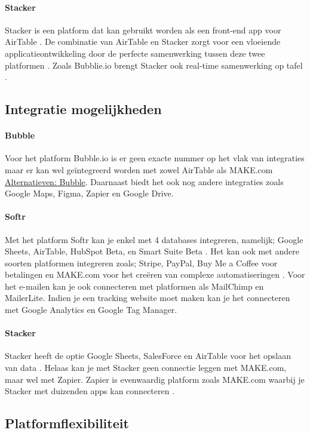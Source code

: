 \paragraph{Stacker}
Stacker is een platform dat kan gebruikt worden als een front-end app voor AirTable \autocite{Advice}. 
De combinatie van AirTable en Stacker zorgt voor een vloeiende applicatieontwikkeling door de perfecte samenwerking tussen deze twee platformen \autocite{Advice}. 
Zoals Bubblie.io brengt Stacker ook real-time samenwerking op tafel \autocite{Allen2020}.
\subsection{Integratie mogelijkheden}%
\label{subsec:integratie-mogelijkheden}
\paragraph{Bubble}
Voor het platform Bubble.io is er geen exacte nummer op het vlak van integraties maar er kan wel geïntegreerd worden met zowel AirTable als MAKE.com \hyperref[subsec:bubble]{Alternatieven: Bubble}. 
Daarnaast biedt het ook nog andere integraties zoals Google Maps, Figma, Zapier en Google Drive.
\paragraph{Softr}
Met het platform Softr kan je enkel met 4 databases integreren, namelijk; Google Sheets, AirTable, HubSpot Beta, en Smart Suite Beta \autocite{Frater2024}. 
Het kan ook met andere soorten platformen integreren zoals; Stripe, PayPal, Buy Me a Coffee voor betalingen en MAKE.com voor het creëren van complexe automatiseringen \autocite{Code2023} \autocite{Youssef2023}. 
Voor het e-mailen kan je ook connecteren met platformen als MailChimp en MailerLite. Indien je een tracking website moet maken kan je het connecteren met Google Analytics en Google Tag Manager.
\paragraph{Stacker}
Stacker heeft de optie Google Sheets, SalesForce en AirTable voor het opslaan van data \autocite{Englert2021} \autocite{JDN2023} \autocite{Youssef2023}. 
Helaas kan je met Stacker geen connectie leggen met MAKE.com, maar wel met Zapier. 
Zapier is evenwaardig platform zoals MAKE.com waarbij je Stacker met duizenden apps kan connecteren \autocite{Zapier}.
\subsection{Platformflexibiliteit}%
\label{subsec:platformflexibiliteit}

